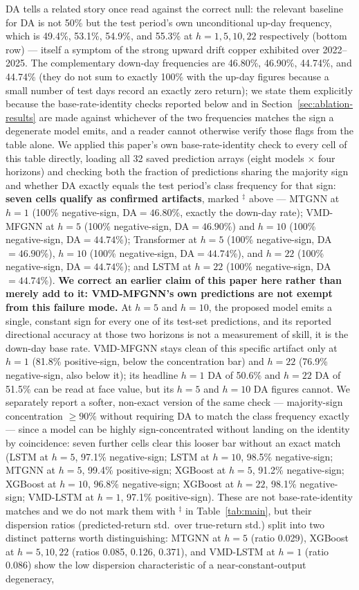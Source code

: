 \documentclass[journal]{IEEEtran}
\begin{document}
DA tells a related story once read against the correct null: the relevant baseline for DA is not 50\% but the test period's own unconditional up-day frequency, which is 49.4\%, 53.1\%, 54.9\%, and 55.3\% at $h=1,5,10,22$ respectively (bottom row) --- itself a symptom of the strong upward drift copper exhibited over 2022--2025. The complementary down-day frequencies are 46.80\%, 46.90\%, 44.74\%, and 44.74\% (they do not sum to exactly 100\% with the up-day figures because a small number of test days record an exactly zero return); we state them explicitly because the base-rate-identity checks reported below and in Section~\ref{sec:ablation-results} are made against whichever of the two frequencies matches the sign a degenerate model emits, and a reader cannot otherwise verify those flags from the table alone. We applied this paper's own base-rate-identity check to every cell of this table directly, loading all 32 saved prediction arrays (eight models $\times$ four horizons) and checking both the fraction of predictions sharing the majority sign and whether DA exactly equals the test period's class frequency for that sign: \textbf{seven cells qualify as confirmed artifacts}, marked $^{\ddagger}$ above --- MTGNN at $h=1$ (100\% negative-sign, DA$=46.80$\%, exactly the down-day rate); VMD-MFGNN at $h=5$ (100\% negative-sign, DA$=46.90$\%) and $h=10$ (100\% negative-sign, DA$=44.74$\%); Transformer at $h=5$ (100\% negative-sign, DA$=46.90$\%), $h=10$ (100\% negative-sign, DA$=44.74$\%), and $h=22$ (100\% negative-sign, DA$=44.74$\%); and LSTM at $h=22$ (100\% negative-sign, DA$=44.74$\%). \textbf{We correct an earlier claim of this paper here rather than merely add to it: VMD-MFGNN's own predictions are not exempt from this failure mode.} At $h=5$ and $h=10$, the proposed model emits a single, constant sign for every one of its test-set predictions, and its reported directional accuracy at those two horizons is not a measurement of skill, it is the down-day base rate. VMD-MFGNN stays clean of this specific artifact only at $h=1$ (81.8\% positive-sign, below the concentration bar) and $h=22$ (76.9\% negative-sign, also below it); its headline $h=1$ DA of 50.6\% and $h=22$ DA of 51.5\% can be read at face value, but its $h=5$ and $h=10$ DA figures cannot. We separately report a softer, non-exact version of the same check --- majority-sign concentration $\geq 90\%$ without requiring DA to match the class frequency exactly --- since a model can be highly sign-concentrated without landing on the identity by coincidence: seven further cells clear this looser bar without an exact match (LSTM at $h=5$, 97.1\% negative-sign; LSTM at $h=10$, 98.5\% negative-sign; MTGNN at $h=5$, 99.4\% positive-sign; XGBoost at $h=5$, 91.2\% negative-sign; XGBoost at $h=10$, 96.8\% negative-sign; XGBoost at $h=22$, 98.1\% negative-sign; VMD-LSTM at $h=1$, 97.1\% positive-sign). These are not base-rate-identity matches and we do not mark them with $^{\ddagger}$ in Table~\ref{tab:main}, but their dispersion ratios (predicted-return std.\ over true-return std.) split into two distinct patterns worth distinguishing: MTGNN at $h=5$ (ratio 0.029), XGBoost at $h=5,10,22$ (ratios 0.085, 0.126, 0.371), and VMD-LSTM at $h=1$ (ratio 0.086) show the low dispersion characteristic of a near-constant-output degeneracy, 
\end{document}
